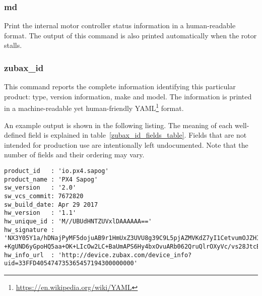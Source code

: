 \documentclass{zubaxdoc}
\begin{document}
\subsubsection{md}

Print the internal motor controller status information in a human-readable format.
The output of this command is also printed automatically when the rotor stalls.

\subsubsection{zubax\_id}\label{sec:cli_zubax_id}

This command reports the complete information identifying this particular product:
type, version information, make and model.
The information is printed in a machine-readable yet human-friendly
YAML\footnote{\url{https://en.wikipedia.org/wiki/YAML}} format.

An example output is shown in the following listing.
The meaning of each well-defined field is explained in table~\ref{zubax_id_fields_table}.
Fields that are not intended for production use are intentionally left undocumented.
Note that the number of fields and their ordering may vary.

\begin{verbatim}
product_id   : 'io.px4.sapog'
product_name : 'PX4 Sapog'
sw_version   : '2.0'
sw_vcs_commit: 7672820
sw_build_date: Apr 29 2017
hw_version   : '1.1'
hw_unique_id : 'M//UBUdHNTZUVxlDAAAAAA=='
hw_signature : 'NX3Y05Y1a/hDNajPyMF5dojuAB9r1HmUxZ3UVU8g39C9L5pjAZMVKdZ7yI1CetvumOJZHIjRYkHOBmMAEKvRU/3mpG\
+KgUND6yGpoHQ5aa+OK+LIcOw2LC+BaUmAPS6Hy4bxOvuARb062QruQlrOXyVc/vs28JtcBzOZo/b/OxY='
hw_info_url  : 'http://device.zubax.com/device_info?uid=33FFD405474735365457194300000000'
\end{verbatim}
\end{document}
